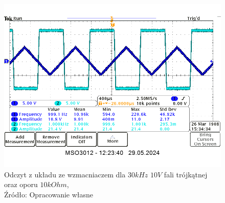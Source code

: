 \documentclass{article}
\begin{document}
  \begin{figure}[!ht]
    \centering
    \includegraphics[scale=0.35]{grafiki/wzmacniacz_30kHz_10V_ramp_10kOhm.png}
      \caption{Odczyt z układu ze wzmacniaczem dla $30kHz$ $10V$ fali trójkątnej oraz oporu $10kOhm$,
      \\Źródło: Opracowanie własne}
  \end{figure}
\end{document}
